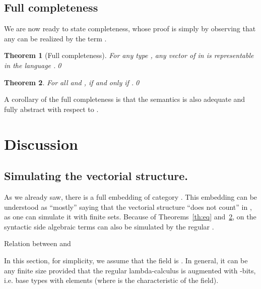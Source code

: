 \documentclass[10pt]{article}
\theoremstyle{plain}
\newtheorem{theorem}{Theorem}
\theoremstyle{definition}
\begin{document}
\subsection{Full completeness}

We are now ready to state completeness, whose proof is simply by
observing that any  can be realized by the term .

\begin{theorem}[Full completeness]
  \label{th:comp-alg}
  For any type , any vector  of  in  is
  representable in the language .\qed
\end{theorem}


\begin{theorem}
  \label{th:eq-alg}
  For all  and ,  if and only if
  .\qed
\end{theorem}

A corollary of the full completeness is that the semantics  is also adequate
and fully abstract with respect to .


\section{Discussion}
\label{sec:discussion}

\subsection{Simulating the vectorial structure.}
\label{sec:fact-alg}

As we already saw, there is a full embedding of category . This embedding can be
understood as ``mostly'' saying that the vectorial structure ``does not
count'' in , as one can simulate it with finite sets.
Because of Theorems~\ref{th:eq} and~\ref{th:eq-alg}, on the syntactic
side algebraic terms can also be simulated by the regular .


\begin{table}[b]
  \caption{Relation between  and }
  \label{tab:l-l-alg}
  \scalebox{.93}{\begin{minipage}{5.1in}
  
  \end{minipage}}
\end{table}



In this section, for simplicity, we assume that the field
is . In general, it can be any finite size provided
that the regular lambda-calculus  is augmented with -bits,
i.e. base types with  elements (where  is the characteristic of
the field).
\end{document}
